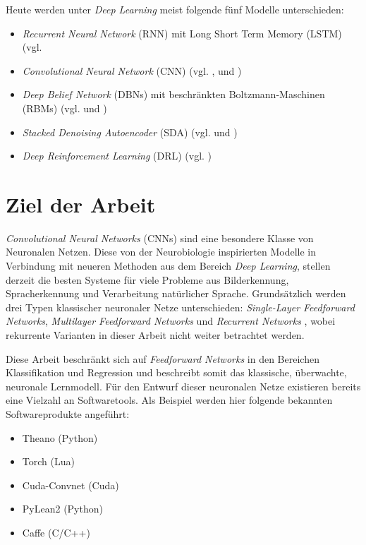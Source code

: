 Heute werden unter \textit{Deep Learning} meist folgende fünf Modelle unterschieden:
\begin{itemize}
\item \textit{Recurrent Neural Network} (RNN) mit Long Short Term Memory (LSTM) (vgl. \cite{Hochreiter1997}
\item \textit{Convolutional Neural Network} (CNN)
	(vgl. \cite{LeCun1998}, \cite{Krizhevsky2012} und \cite{Simonyan2014})
\item \textit{Deep Belief Network} (DBNs) mit beschränkten Boltzmann-Maschinen (RBMs) 
	(vgl. \cite{Bengio2007} und \cite{Ranzato2007b})%
\item \textit{Stacked Denoising Autoencoder} (SDA) 
	(vgl. \cite{Vincent2008} und \cite{Vincent2010})
\item \textit{Deep Reinforcement Learning} (DRL) (vgl. \cite{Mnih2013})
\end{itemize}

\section{Ziel der Arbeit}
\label{ch:Ziele}
\textit{Convolutional Neural Networks} (CNNs) sind eine besondere Klasse von Neuronalen Netzen. Diese von der Neurobiologie inspirierten Modelle in Verbindung mit neueren Methoden aus dem Bereich \textit{Deep Learning}, stellen derzeit die besten Systeme für viele Probleme aus Bilderkennung, Spracherkennung und Verarbeitung natürlicher Sprache. 
Grundsätzlich werden drei Typen klassischer neuronaler Netze unterschieden: \textit{Single-Layer Feedforward Networks}, \textit{Multilayer Feedforward Networks} und \textit{Recurrent Networks} \cite[vgl.][S. 22f]{Haykin1999}, wobei rekurrente Varianten in dieser Arbeit nicht weiter betrachtet werden.

Diese Arbeit beschränkt sich auf \textit{Feedforward Networks} in den Bereichen Klassifikation und Regression und beschreibt somit das klassische, überwachte, neuronale Lernmodell.
Für den Entwurf dieser neuronalen Netze existieren bereits eine Vielzahl an Softwaretools. Als Beispiel werden hier folgende bekannten Softwareprodukte angeführt:
\begin{itemize}
\item Theano (Python) \cite[vgl.][]{Bergstra2010}

\item Torch (Lua) \cite[vgl.][]{Torch2011}

\item Cuda-Convnet (Cuda) \cite[vgl.][]{Nouri2013}

\item PyLean2 (Python) \cite[vgl.][]{PyLearn22013}

\item Caffe (C/C++) \cite[vgl.][]{Caffe2014}
\end{itemize}

